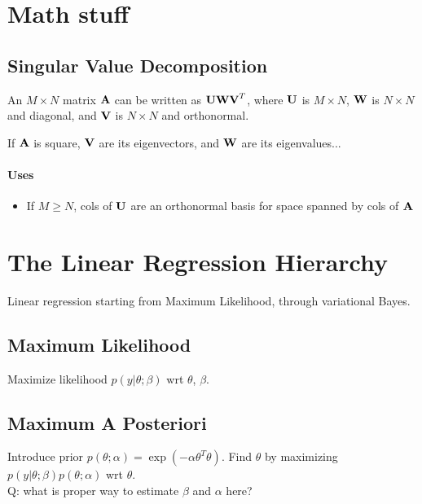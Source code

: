 \documentclass[11pt]{article}
\begin{document}
\newpage
\begin{appendices}
\section{Math stuff}
\subsection{Singular Value Decomposition}
\label{subsec:SVD}
An $M \times N$ matrix $\textbf{A}$ can be written as $\textbf{U}\textbf{W}\textbf{V}^T$,
where $\textbf{U}$ is $M \times N$, $\textbf{W}$ is $N \times N$ and diagonal, and
$\textbf{V}$ is $N \times N$ and orthonormal.

If $\textbf{A}$ is square, $\textbf{V}$ are its eigenvectors, and $\textbf{W}$
are its eigenvalues...

\paragraph{Uses}
\begin{itemize}
  \item If $M \geq N$, cols of $\textbf{U}$ are an orthonormal basis for space
  spanned by cols of $\textbf{A}$
\end{itemize}

\TODOFIN{}



\section{The Linear Regression Hierarchy}
Linear regression starting from Maximum Likelihood, through variational Bayes.
\subsection{Maximum Likelihood}
Maximize likelihood $p(y | \theta ; \beta)$ wrt $\theta$, $\beta$.

\subsection{Maximum A Posteriori}
Introduce prior $p(\theta ; \alpha) = \exp(-\alpha \theta^T \theta)$. Find
$\theta$ by maximizing $p(y | \theta ; \beta) p(\theta ; \alpha)$ wrt $\theta$.
\\
Q: what is proper way to estimate $\beta$ and $\alpha$ here?


\end{appendices}
\end{document}
